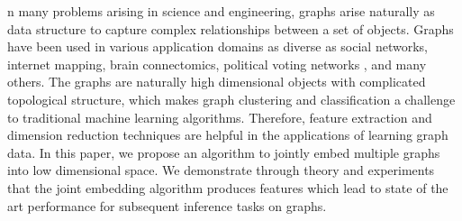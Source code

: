 \documentclass[10pt,journal,compsoc]{IEEEtran}
\begin{document}
\maketitle


\IEEEdisplaynontitleabstractindextext
\IEEEpeerreviewmaketitle


\noindent {}n many problems arising in science and engineering, graphs arise naturally as data structure to capture complex relationships between a set of objects. Graphs have been used in various application domains as diverse as social networks\cite{otte2002social}, internet mapping\cite{govindan2000heuristics}, brain connectomics\cite{bullmore2011brain}, political voting networks \cite{ward2011network},  and many others. The graphs are naturally high dimensional objects with complicated topological structure, which makes graph clustering and classification a challenge to traditional machine learning algorithms. Therefore, feature extraction and dimension reduction techniques are helpful in the applications of learning graph data. In this paper, we propose an algorithm to jointly embed multiple graphs into low dimensional space. We demonstrate through theory and experiments that the joint embedding algorithm produces features which lead to state of the art performance for subsequent inference tasks on graphs.  \\
\end{document}
